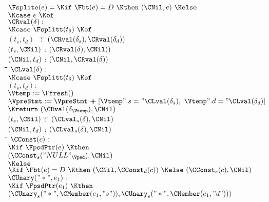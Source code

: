 \begin{docpart}
\begin{figure}[htbp]
\begin{center}
{{    \begin{pseudocode}
      $\Fsplite(e) = \Kif\ \Fbt(e) = D\ \Kthen\ (\CNil, e)\ \Kelse$ \+\\
        $\Kcase\ e\ \Kof$ \+\\
          $\CRval(\delta) : $ \+\\
            $\Kcase\ \Fsplitt(t_\delta)\ \Kof$ \+\\
              $(t_s,t_d)$ \ \= : \= $(\CRval(\delta_s), \CRval(\delta_d))$ \\
              $(t_s,\CNil)$ \> : \> $(\CRval(\delta), \CNil))$ \\
              $(\CNil,t_d)$ \> : \> $(\CNil, \CRval(\delta))$
              \-\-\\[1ex]
\quad\=\quad\=\quad\=\quad\=\quad\=\quad\=\quad\=\quad\=\quad\=\quad\=\kill
          $\CLval(\delta) : $ \+\\
            $\Kcase\ \Fsplitt(t_\delta)\ \Kof$ \+\\
              $(t_s,t_d) : {}$ \+\\
                $\Vtemp := \Ffresh()$ \\
                $\VpreStmt := \VpreStmt \append
                [{\Vtemp}".s = "\CLval(\delta_s),\
                 {\Vtemp}".d = "\CLval(\delta_d)]$ \\
                $\Kreturn\ (\CRval(\delta_{\Vtemp}), \CNil)$ \-\\
              $(t_s,\CNil)$ \= : \= $(\CLval_s(\delta), \CNil)$ \\
              $(\CNil,t_d)$ \> : \> $(\CLval_s(\delta), \CNil)$
              \-\-\\[1ex]
\quad\=\quad\=\quad\=\quad\=\quad\=\quad\=\quad\=\quad\=\quad\=\quad\=\kill
          $\CConst(c) : {}$ \+\\
            $\Kif\ \FpsdPtr(e)\ \Kthen$ \+\\
               $(\CConst_s("NULL"_{\Vpsd}), \CNil)$ \-\\
             $\Kelse$ \+\\
               $\Kif\ \Fbt(e) = D\ \Kthen\ 
                  (\CNil, \CConst_d(c))\
                \Kelse\
                  (\CConst_s(c), \CNil)$ 
              \-\-\\[1ex]
          $\CUnary("*",e_1) : {}$ \+\\
            $\Kif\ \FpsdPtr(e_1)\ \Kthen$ \+\\
              $(\CUnary_s("*", \CMember(e_1, "s")), 
                \CUnary_s("*", \CMember(e_1, "d")))$ \-\\

\end{pseudocode}}}
\end{center}
\end{figure}
\end{docpart}
